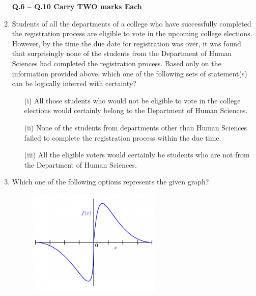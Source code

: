 \documentclass[12pt]{article}
\theoremstyle{remark}
\begin{document}
\begin{enumerate}
\newpage
\textbf{Q.6 – Q.10 Carry TWO marks Each}
\item Students of all the departments of a college who have successfully completed the registration process are eligible to vote in the upcoming college elections. However, by the time the due date for registration was over, it was found that surprisingly none of the students from the Department of Human Sciences had completed the registration process. Based only on the information provided above, which one of the following sets of statement(s) can be logically inferred with certainty?
\begin{enumerate}
    \item[(i)] All those students who would not be eligible to vote in the college elections would certainly belong to the Department of Human Sciences.
    \item[(ii)] None of the students from departments other than Human Sciences failed to complete the registration process within the due time.
    \item[(iii)] All the eligible voters would certainly be students who are not from the Department of Human Sciences.
\end{enumerate}
\begin{enumerate}
\end{enumerate}
\hfill{}
\item Which one of the following options represents the given graph?
\begin{figure}[H]
    \centering
    \includegraphics[width=0.6\textwidth]{Figs/Q7.png}

\end{figure}
\end{enumerate}
\end{document}

